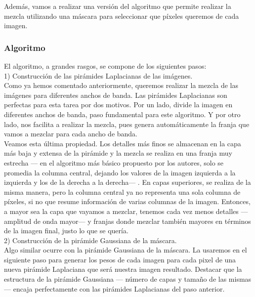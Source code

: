 \documentclass[10pt,a4paper]{article}
\theoremstyle{definition}
\begin{document}
Además, vamos a realizar una versión del algoritmo que permite realizar la mezcla utilizando una máscara para seleccionar que píxeles queremos de cada imagen.\\

\subsubsection{Algoritmo}

El algoritmo, a grandes rasgos, se compone de los siguientes pasos:\\

1) Construcción de las pirámides Laplacianas de las imágenes.\\

Como ya hemos comentado anteriormente, queremos realizar la mezcla de las imágenes para diferentes anchos de banda. Las pirámides Laplacianas son perfectas para esta tarea por dos motivos. Por un lado, divide la imagen en diferentes anchos de banda, paso fundamental para este algoritmo. Y por otro lado, nos facilita a realizar la mezcla, pues genera automáticamente la franja que vamos a mezclar para cada ancho de banda.\\

Veamos esta última propiedad. Los detalles más finos se almacenan en la capa más baja y extensa de la pirámide y la mezcla se realiza en  una franja muy estrecha --- en el algoritmo más básico propuesto por los autores, solo se promedia la columna central, dejando los valores de la imagen izquierda a la izquierda y los de la derecha a la derecha--- . En capas superiores, se realiza de la misma manera, pero la columna central ya no representa una sola columna de píxeles, si no que resume información de varias columnas de la imagen. Entonces, a mayor sea la capa que vayamos a mezclar, tenemos cada vez menos detalles --- amplitud de onda mayor--- y franjas donde mezclar también mayores en términos de la imagen final, justo lo que se quería.\\

2) Construcción de la pirámide Gaussiana de la máscara.\\

Algo similar ocurre con la pirámide Gaussiana de la máscara. La usaremos en el siguiente paso para generar los pesos de cada imagen para cada pixel de una nueva pirámide Laplaciana que será nuestra imagen resultado. Destacar que la estructura de la pirámide Gaussiana --- número de capas y tamaño de las mismas --- encaja perfectamente con las pirámides Laplacianas del paso anterior.
\end{document}
